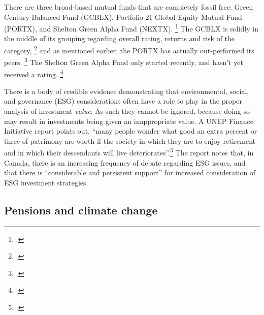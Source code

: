 \documentclass[10pt]{article}
\begin{document}
There are three broad-based mutual funds that are completely fossil free: Green Century Balanced Fund (GCBLX), Portfolio 21 Global Equity Mutual Fund (PORTX), and Shelton Green Alpha Fund (NEXTX). \footcite{GFFMyMoney}
The GCBLX is solidly in the middle of its grouping regarding overall rating, returns and risk of the category, \footcite{GCBLX} and as mentioned earlier, the PORTX has actually out-performed its peers. \footcite{PORTX}
The Shelton Green Alpha Fund only started recently, and hasn't yet received a rating. \footcite{NEXTX}



There is a body of credible evidence demonstrating that environmental, social, and governance (ESG) considerations often have a role to play in the proper analysis of investment \emph{value}. 
As such they cannot be ignored, because doing so may result in investments being given an inappropriate value.
A UNEP Finance Initiative report points out, ``many people wonder what good an extra percent or three of patrimony are worth if the society in which they are to enjoy retirement and in which their descendants will live deteriorates''.\footcite{UNEPFinanceInit}
The report notes that, in Canada, there is an increasing frequency of debate regarding ESG issues, and that there is ``considerable and persistent support'' for increased consideration of ESG investment strategies.



\subsection {Pensions and climate change}
\end{document}
